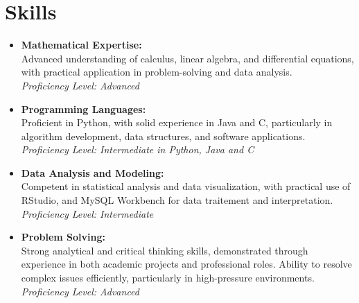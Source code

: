 \documentclass[10pt, letterpaper]{article}
\newenvironment{onecolentry}{
    \begin{adjustwidth}{
        0.2 cm + 0.00001 cm
    }{
        0.2 cm + 0.00001 cm
    }
}{
    \end{adjustwidth}
} %
\let\hrefWithoutArrow\href
\renewcommand{\href}[2]{\hrefWithoutArrow{#1}{\ifthenelse{\equal{#2}{}}{ }{#2 }\raisebox{.15ex}{\footnotesize \faExternalLink*}}}
\begin{document}
        \vspace{0.2 cm}

    \section{Skills}

        \begin{itemize}[label=\textbullet]

            \item \textbf{Mathematical Expertise:} \\
            Advanced understanding of calculus, linear algebra, and differential equations, with practical application in problem-solving and data analysis. \\
            \textit{Proficiency Level: Advanced}
        
            \item \textbf{Programming Languages:} \\
            Proficient in Python, with solid experience in Java and C, particularly in algorithm development, data structures, and software applications. \\
            \textit{Proficiency Level: Intermediate in Python, Java and C}
        
            \item \textbf{Data Analysis and Modeling:} \\
            Competent in statistical analysis and data visualization, with practical use of RStudio, and MySQL Workbench for data traitement and interpretation. \\
            \textit{Proficiency Level: Intermediate}
        

            \item \textbf{Problem Solving:} \\
            Strong analytical and critical thinking skills, demonstrated through experience in both academic projects and professional roles. Ability to resolve complex issues efficiently, particularly in high-pressure environments. \\
            \textit{Proficiency Level: Advanced}


\end{itemize}
\end{document}

